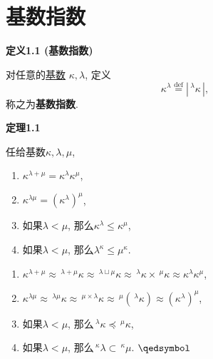 


\setlength{\abovedisplayskip}{1pt}
\setlength{\belowdisplayskip}{1pt}

\section{基数指数}

\hypertarget{sec:定义1.1}{}
\noindent\textbf{定义1.1 (基数指数)}

对任意的\href{../01 基数/01 基数#nameddest=sec:定义1.1}{基数}
$\kappa,\lambda$, 定义
\[
    \kappa^\lambda\overset{\mathrm{def}}{=}|\,^\lambda\kappa\,|,
\]
称之为\textbf{基数指数}.


\vspace{10pt}

\hypertarget{sec:定理1.1}{}
\noindent\textbf{定理1.1}

任给基数$\kappa,\lambda,\mu$,
\begin{enumerate}
    \item $\kappa^{\lambda+\mu}=\kappa^\lambda\kappa^\mu$,
    \item $\kappa^{\lambda\mu}=(\kappa^\lambda)^\mu$,
    \item 如果$\lambda<\mu$, 那么$\kappa^\lambda\leqslant\kappa^\mu$,
    \item 如果$\lambda<\mu$, 那么$\lambda^\kappa\leqslant\mu^\kappa$.
\end{enumerate}


\begin{enumerate}
    \item $\kappa^{\lambda+\mu}\approx\,\!^{\lambda+\mu}\kappa\approx
    \,\!^{\lambda\sqcup\mu}\kappa\approx
    \,\!^\lambda\kappa\times\,\!^\mu\kappa\approx\kappa^\lambda\kappa^\mu$,
    \item $\kappa^{\lambda\mu}\approx\,\!^{\lambda\mu}\kappa\approx
    \,\!^{\mu\times\lambda}\kappa\approx
    \,\!^\mu(\,\!^\lambda\kappa)\approx(\kappa^\lambda)^\mu$,
    \item 如果$\lambda<\mu$, 那么$\,\!^\lambda\kappa\preccurlyeq\,\!^\mu\kappa$,
    \item 如果$\lambda<\mu$, 那么$\,\!^\kappa\lambda\subset\,\!^\kappa\mu$.
    \hfill $\qedsymbol$
\end{enumerate}

\vspace{10pt}

